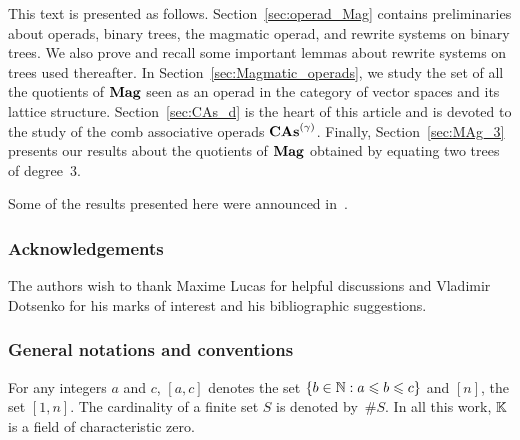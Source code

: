 This text is presented as follows. Section~\ref{sec:operad_Mag} contains
preliminaries about operads, binary trees, the magmatic operad, and
rewrite systems on binary trees. We also prove and recall some important
lemmas about rewrite systems on trees used thereafter. In
Section~\ref{sec:Magmatic_operads}, we study the set of all the
quotients of $\mathbf{Mag}$ seen as an operad in the category of vector spaces
and its lattice structure. Section~\ref{sec:CAs_d} is the heart of this
article and is devoted to the study of the comb associative operads
$\mathbf{CAs}^{\left(\gamma\right)}$. Finally, Section~\ref{sec:MAg_3} presents our results
about the quotients of $\mathbf{Mag}$ obtained by equating two trees of
degree~$3$.
\medbreak

Some of the results presented here were announced in~\cite{CCG18}.
\medbreak

\subsubsection*{Acknowledgements}
The authors wish to thank Maxime Lucas for helpful discussions and
Vladimir Dotsenko for his marks of interest and his bibliographic
suggestions.
\medbreak

\subsubsection*{General notations and conventions}
For any integers $a$ and $c$, $[a, c]$ denotes the set
$\{b \in \mathbb{N} : a \leqslant b \leqslant c\}$ and $[n]$, the set $[1, n]$. The
cardinality of a finite set $S$ is denoted by~$\# S$. In all this
work, $\mathbb{K}$ is a field of characteristic zero.
\medbreak
